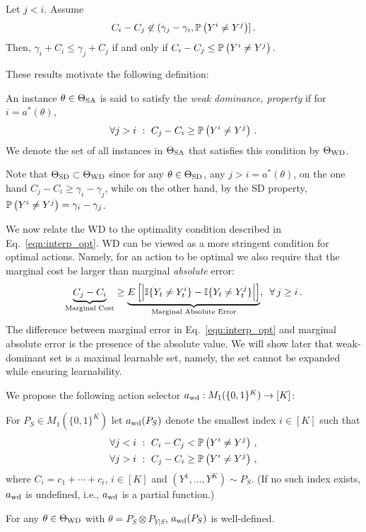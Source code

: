 \begin{prop}
\label{prop:jlei}
Let $j<i$. Assume
\begin{align}
\label{eq:cond2}
C_i - C_j \not\in (\gamma_j - \gamma_i, \mathbb{P}\left(Y^i \ne Y^j\right) ]\,.
\end{align}
Then, $\gamma_i + C_i \le \gamma_j + C_j$ if and only if $C_i - C_j \le \mathbb{P}\left(Y^i \ne Y^j\right)$.
\end{prop}

These results motivate the following definition:
\begin{defi}
	An instance $\theta \in \Theta_{\mathrm{SA}}$  is said to satisfy the \emph{weak dominance,  property} if 
	for $i = a^*(\theta)$,
	\begin{align}
	\label{eqn:WD} \forall j>i\,\,: \,\, C_j - C_i \ge \mathbb{P}\left(Y^i\ne Y^j\right)\,.
	\end{align}
We denote the set of all instances in $\Theta_{\mathrm{SA}}$ that satisfies this condition by $\Theta_{\mathrm{WD}}$.	
\end{defi}
Note that $\Theta_{\mathrm{SD}}\subset \Theta_{\mathrm{WD}}$ since for any $\theta\in \Theta_{\mathrm{SD}}$, any $j>i = a^*(\theta)$, on the one hand $C_j - C_i \ge \gamma_i - \gamma_j$, while on the other hand, by the SD property, $\mathbb{P}\left(Y^i\ne Y^j\right) = \gamma_i - \gamma_j$.

We now relate the WD to the optimality condition described in Eq.~\eqref{eqn:interp_opt}. WD can be viewed as a more stringent condition for optimal actions. Namely, for an action to be optimal we also require that the marginal cost be larger than marginal \emph{absolute} error:
\begin{equation} \label{eqn:interp_WD}
\underbrace{C_j - C_i}_{\text{Marginal Cost}} \geq \underbrace{ E \left [ \left | \mathbb{I}\{Y_t \ne Y_t^i\} - \mathbb{I}\{Y_t \ne Y_t^j\} \right | \right ]}_{\text{Marginal Absolute Error}},\,\,\, \forall \, j \geq i\,.
\end{equation}
The difference between marginal error in Eq.~\eqref{eqn:interp_opt} and marginal absolute error is the presence of the absolute value. We will show later that weak-dominant set is a maximal learnable set, namely, the set cannot be expanded while ensuring learnability.


We propose the following action selector $a_{\mathrm{wd}}: M_1(\{0,1\}^K)  \to [K]$:
\begin{defi}\label{def:awd}
For $P_S \in M_1(\{0,1\}^K) $ let $a_{\mathrm{wd}}(P_S)$ denote the smallest index $i\in [K]$ such that
\begin{subequations}
\begin{align}
\forall j<i \,\,:\,\, C_i - C_j < \mathbb{P}\left( Y^i \ne Y^j \right)\,, \label{eq:wd1}\\ 
\forall j>i \,\,:\,\, C_j - C_i \ge \mathbb{P}\left( Y^i \ne Y^j \right)\,, \label{eq:wd2}
\end{align}
\end{subequations}
where $C_i = c_1+\cdots + c_i$, $i\in [K]$ and $(Y^1,\dots,Y^K) \sim P_S$.
(If no such index exists, $a_{\mathrm{wd}}$ is undefined, i.e., $a_{\mathrm{wd}}$ is a partial function.)
\end{defi}
\begin{prop}
\label{prop:awdwelldef}
For any $\theta \in \Theta_{\mathrm{WD}}$ with $\theta = P_S\otimes P_{Y|S}$, $a_{\mathrm{wd}}(P_S)$ is well-defined.
\end{prop}

